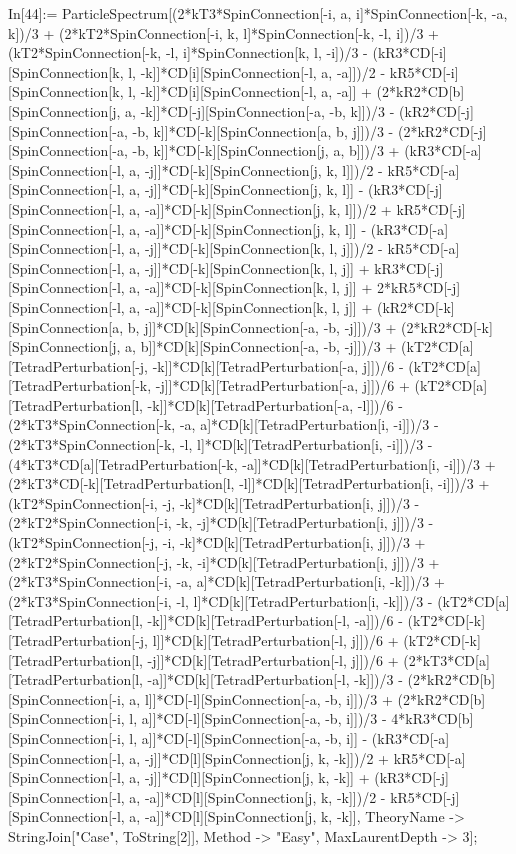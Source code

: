 In[44]:= ParticleSpectrum[(2*kT3*SpinConnection[-i, a, i]*SpinConnection[-k, -a, k])/3 + (2*kT2*SpinConnection[-i, k, l]*SpinConnection[-k, -l, i])/3 + (kT2*SpinConnection[-k, -l, i]*SpinConnection[k, l, -i])/3 - (kR3*CD[-i][SpinConnection[k, l, -k]]*CD[i][SpinConnection[-l, a, -a]])/2 - kR5*CD[-i][SpinConnection[k, l, -k]]*CD[i][SpinConnection[-l, a, -a]] + (2*kR2*CD[b][SpinConnection[j, a, -k]]*CD[-j][SpinConnection[-a, -b, k]])/3 - (kR2*CD[-j][SpinConnection[-a, -b, k]]*CD[-k][SpinConnection[a, b, j]])/3 - (2*kR2*CD[-j][SpinConnection[-a, -b, k]]*CD[-k][SpinConnection[j, a, b]])/3 + (kR3*CD[-a][SpinConnection[-l, a, -j]]*CD[-k][SpinConnection[j, k, l]])/2 - kR5*CD[-a][SpinConnection[-l, a, -j]]*CD[-k][SpinConnection[j, k, l]] - (kR3*CD[-j][SpinConnection[-l, a, -a]]*CD[-k][SpinConnection[j, k, l]])/2 + kR5*CD[-j][SpinConnection[-l, a, -a]]*CD[-k][SpinConnection[j, k, l]] - (kR3*CD[-a][SpinConnection[-l, a, -j]]*CD[-k][SpinConnection[k, l, j]])/2 - kR5*CD[-a][SpinConnection[-l, a, -j]]*CD[-k][SpinConnection[k, l, j]] + kR3*CD[-j][SpinConnection[-l, a, -a]]*CD[-k][SpinConnection[k, l, j]] + 2*kR5*CD[-j][SpinConnection[-l, a, -a]]*CD[-k][SpinConnection[k, l, j]] + (kR2*CD[-k][SpinConnection[a, b, j]]*CD[k][SpinConnection[-a, -b, -j]])/3 + (2*kR2*CD[-k][SpinConnection[j, a, b]]*CD[k][SpinConnection[-a, -b, -j]])/3 + (kT2*CD[a][TetradPerturbation[-j, -k]]*CD[k][TetradPerturbation[-a, j]])/6 - (kT2*CD[a][TetradPerturbation[-k, -j]]*CD[k][TetradPerturbation[-a, j]])/6 + (kT2*CD[a][TetradPerturbation[l, -k]]*CD[k][TetradPerturbation[-a, -l]])/6 - (2*kT3*SpinConnection[-k, -a, a]*CD[k][TetradPerturbation[i, -i]])/3 - (2*kT3*SpinConnection[-k, -l, l]*CD[k][TetradPerturbation[i, -i]])/3 - (4*kT3*CD[a][TetradPerturbation[-k, -a]]*CD[k][TetradPerturbation[i, -i]])/3 + (2*kT3*CD[-k][TetradPerturbation[l, -l]]*CD[k][TetradPerturbation[i, -i]])/3 + (kT2*SpinConnection[-i, -j, -k]*CD[k][TetradPerturbation[i, j]])/3 - (2*kT2*SpinConnection[-i, -k, -j]*CD[k][TetradPerturbation[i, j]])/3 - (kT2*SpinConnection[-j, -i, -k]*CD[k][TetradPerturbation[i, j]])/3 + (2*kT2*SpinConnection[-j, -k, -i]*CD[k][TetradPerturbation[i, j]])/3 + (2*kT3*SpinConnection[-i, -a, a]*CD[k][TetradPerturbation[i, -k]])/3 + (2*kT3*SpinConnection[-i, -l, l]*CD[k][TetradPerturbation[i, -k]])/3 - (kT2*CD[a][TetradPerturbation[l, -k]]*CD[k][TetradPerturbation[-l, -a]])/6 - (kT2*CD[-k][TetradPerturbation[-j, l]]*CD[k][TetradPerturbation[-l, j]])/6 + (kT2*CD[-k][TetradPerturbation[l, -j]]*CD[k][TetradPerturbation[-l, j]])/6 + (2*kT3*CD[a][TetradPerturbation[l, -a]]*CD[k][TetradPerturbation[-l, -k]])/3 - (2*kR2*CD[b][SpinConnection[-i, a, l]]*CD[-l][SpinConnection[-a, -b, i]])/3 + (2*kR2*CD[b][SpinConnection[-i, l, a]]*CD[-l][SpinConnection[-a, -b, i]])/3 - 4*kR3*CD[b][SpinConnection[-i, l, a]]*CD[-l][SpinConnection[-a, -b, i]] - (kR3*CD[-a][SpinConnection[-l, a, -j]]*CD[l][SpinConnection[j, k, -k]])/2 + kR5*CD[-a][SpinConnection[-l, a, -j]]*CD[l][SpinConnection[j, k, -k]] + (kR3*CD[-j][SpinConnection[-l, a, -a]]*CD[l][SpinConnection[j, k, -k]])/2 - kR5*CD[-j][SpinConnection[-l, a, -a]]*CD[l][SpinConnection[j, k, -k]], TheoryName -> StringJoin["Case", ToString[2]], Method -> "Easy", MaxLaurentDepth -> 3]; 